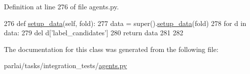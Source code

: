 Definition at line 276 of file agents.\+py.


\begin{DoxyCode}
276     \textcolor{keyword}{def }\hyperlink{namespaceparlai_1_1tasks_1_1multinli_1_1agents_a4fa2cb0ba1ed745336ad8bceed36b841}{setup\_data}(self, fold):
277         data = super().\hyperlink{namespaceparlai_1_1tasks_1_1multinli_1_1agents_a4fa2cb0ba1ed745336ad8bceed36b841}{setup\_data}(fold)
278         \textcolor{keywordflow}{for} d \textcolor{keywordflow}{in} data:
279             del d[\textcolor{stringliteral}{'label\_candidates'}]
280         \textcolor{keywordflow}{return} data
281 
282 
\end{DoxyCode}


The documentation for this class was generated from the following file\+:\begin{DoxyCompactItemize}
\item 
parlai/tasks/integration\+\_\+tests/\hyperlink{parlai_2tasks_2integration__tests_2agents_8py}{agents.\+py}\end{DoxyCompactItemize}
